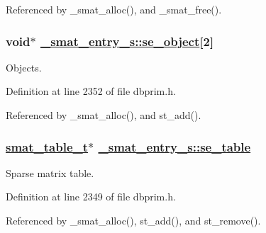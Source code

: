 Referenced by \_\-smat\_\-alloc(), and \_\-smat\_\-free().\hypertarget{struct__smat__entry__s_o4}{
\subsubsection[se\_\-object]{\setlength{\rightskip}{0pt plus 5cm}void$\ast$ \hyperlink{struct__smat__entry__s_o4}{\_\-smat\_\-entry\_\-s::se\_\-object}\mbox{[}2\mbox{]}}}
\label{struct__smat__entry__s_o4}


Objects. 

Definition at line 2352 of file dbprim.h.

Referenced by \_\-smat\_\-alloc(), and st\_\-add().\hypertarget{struct__smat__entry__s_o1}{
\subsubsection[se\_\-table]{\setlength{\rightskip}{0pt plus 5cm}\hyperlink{struct__smat__table__s}{smat\_\-table\_\-t}$\ast$ \hyperlink{struct__smat__entry__s_o1}{\_\-smat\_\-entry\_\-s::se\_\-table}}}
\label{struct__smat__entry__s_o1}


Sparse matrix table. 

Definition at line 2349 of file dbprim.h.

Referenced by \_\-smat\_\-alloc(), st\_\-add(), and st\_\-remove().
